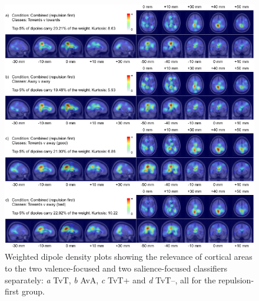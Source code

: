 \begin{figure}[h]
    \renewcommand\thefigure{\ref{chapter:salval}.S2}
    \centering
    \includegraphics[width=\textwidth]{figures/salval-negfirst-wdd-combined-separate.pdf}
    \caption[Weighted dipole density plots for the two valence-focused and salience focused-classifiers separately, for the repulsion-first group.]{Weighted dipole density plots showing the relevance of cortical areas to the two valence-focused and two salience-focused classifiers separately: \emph{a} TvT, \emph{b} AvA, \emph{c} TvT+ and \emph{d} TvT--, all for the repulsion-first group.}
    \label{fig:negfirst-wdd-combined-separate}
\end{figure}

\vfill\null